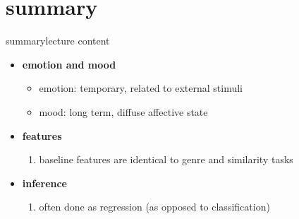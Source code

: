     \section{summary}
        \begin{frame}{summary}{lecture content}
            \begin{itemize}
                \item   \textbf{emotion and mood}
                    \begin{itemize}
                        \item   emotion: temporary, related to external stimuli
                        \item   mood: long term, diffuse affective state
                    \end{itemize}
                \bigskip
                \item   \textbf{features}
                    \begin{enumerate}
                        \item   baseline features are identical to genre and similarity tasks
                    \end{enumerate}
                \bigskip
                \item   \textbf{inference}
                    \begin{enumerate}
                        \item   often done as regression (as opposed to classification)
                    \end{enumerate}
            \end{itemize}
        \end{frame}

